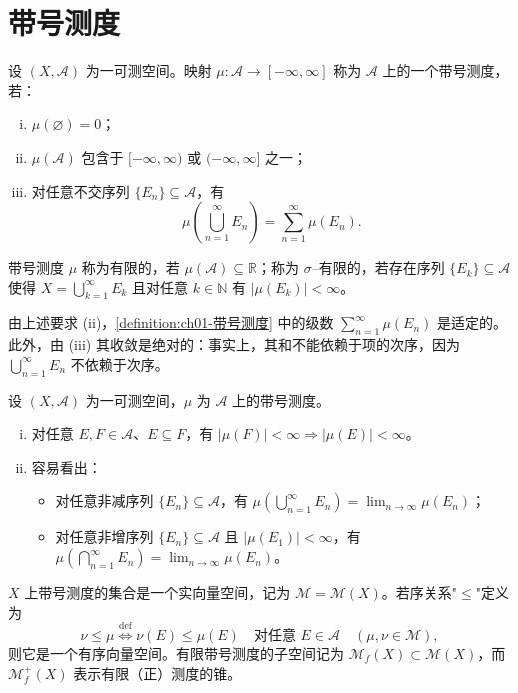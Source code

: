 \documentclass[../../main.tex]{subfiles}%
\begin{document}
\section{带号测度}\label{section:ch01-带号测度}

\begin{definition}\label{definition:ch01-带号测度}
设 $(X,\mathcal{A})$ 为一可测空间。映射 $\mu:\mathcal{A}\to[-\infty,\infty]$ 称为 $\mathcal{A}$ 上的一个带号测度，若：
\begin{enumerate}[(i)]
\item $\mu(\varnothing )=0$；
\item $\mu(\mathcal{A})$ 包含于 $[-\infty,\infty)$ 或 $(-\infty,\infty]$ 之一；
\item 对任意不交序列 $\{E_n\}\subseteq\mathcal{A}$，有
\[
\mu\left(\bigcup_{n=1}^\infty E_n\right)=\sum_{n=1}^\infty\mu(E_n).
\]
\end{enumerate}
带号测度 $\mu$ 称为有限的，若 $\mu(\mathcal{A})\subseteq\mathbb{R}$；称为 $\sigma$--有限的，若存在序列 $\{E_k\}\subseteq\mathcal{A}$ 使得 $X=\bigcup_{k=1}^\infty E_k$ 且对任意 $k\in\mathbb{N}$ 有 $|\mu(E_k)|<\infty$。
\end{definition}

由上述要求 (ii)，\cref{definition:ch01-带号测度} 中的级数 $\sum_{n=1}^\infty\mu(E_n)$ 是适定的。此外，由 (iii) 其收敛是绝对的：事实上，其和不能依赖于项的次序，因为 $\bigcup_{n=1}^\infty E_n$ 不依赖于次序。

\begin{remark}\label{remark:ch01-带号测度性质}
设 $(X,\mathcal{A})$ 为一可测空间，$\mu$ 为 $\mathcal{A}$ 上的带号测度。
\begin{enumerate}[(i)]
\item 对任意 $E,F\in\mathcal{A}$、$E\subseteq F$，有 $|\mu(F)|<\infty\Rightarrow|\mu(E)|<\infty$。
\item 容易看出：
\begin{itemize}
\item 对任意非减序列 $\{E_n\}\subseteq\mathcal{A}$，有 $\mu\left(\bigcup_{n=1}^\infty E_n\right)=\lim_{n\to\infty}\mu(E_n)$；
\item 对任意非增序列 $\{E_n\}\subseteq\mathcal{A}$ 且 $|\mu(E_1)|<\infty$，有 $\mu\left(\bigcap_{n=1}^\infty E_n\right)=\lim_{n\to\infty}\mu(E_n)$。
\end{itemize}
\end{enumerate}
\end{remark}

$X$ 上带号测度的集合是一个实向量空间，记为 $\mathcal{M}=\mathcal{M}(X)$。若序关系"$\leqslant$"定义为
\[
\nu\leqslant\mu\overset{\mathrm{def}}{\Longleftrightarrow}\nu(E)\leqslant\mu(E)\quad\text{对任意 }E\in\mathcal{A}\quad(\mu,\nu\in\mathcal{M}),
\]
则它是一个有序向量空间。有限带号测度的子空间记为 $\mathcal{M}_f(X)\subset\mathcal{M}(X)$，而 $\mathcal{M}_f^+(X)$ 表示有限（正）测度的锥。
\end{document}
